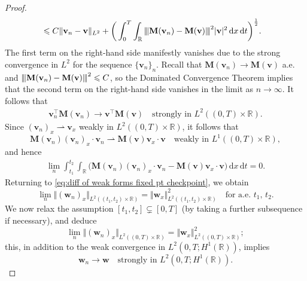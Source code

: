 \documentclass[11pt,a4paper,reqno]{amsart}
\numberwithin{equation}{section}
\theoremstyle{definition}
\theoremstyle{remark}
\newcommand{\vertiii}[1]{{\left\vert\kern-0.25ex\left\vert\kern-0.25ex\left\vert #1 
    \right\vert\kern-0.25ex\right\vert\kern-0.25ex\right\vert}}
\newcommand{\bv}{\mathbf{v}}
\newcommand{\bw}{\mathbf{w}}
\renewcommand{\d}{\, \mathrm{d}}
\newcommand{\bM}{\mathbf{M}}
\renewcommand{\leq}{\leqslant}
\begin{document}
{\begin{proof}
\begin{equation}
\begin{aligned}
      &\leq C \Vert \bv_n - \bv \Vert_{L^2} + \bigg( \int_{0}^{T}\int_\mathbb{R} \vertiii{\bM(\bv_n) - \bM(\bv)}^2 |\bv|^2 \d x \d t \bigg)^{\frac{1}{2}}. 
    \end{aligned}
\end{equation}
The first term on the right-hand side manifestly vanishes due to the strong convergence in $L^2$ for the sequence $\{\bv_n\}_n$. Recall that $\bM(\bv_n) \to \bM(\bv)$ a.e.~ and $\vertiii{\bM(\bv_n) - \bM(\bv)}^2 \leq C$, so the Dominated Convergence Theorem implies that the second term on the right-hand side vanishes in the limit as $n\to\infty$. It follows that 
\begin{equation*}
    \begin{aligned}
      \bv_n^\intercal \bM(\bv_n) \to \bv^\intercal \bM(\bv) \quad \text{strongly in } L^2((0,T)\times\mathbb{R}). 
    \end{aligned}
\end{equation*}
Since $(\bv_n)_x \rightharpoonup \bv_x$ weakly in $L^2((0,T)\times\mathbb{R})$, it follows that 
\begin{equation*}
    \bM(\bv_n) (\bv_n)_x \cdot \bv_n \rightharpoonup \bM(\bv) \bv_x \cdot \bv \quad \text{weakly in } L^1((0,T)\times\mathbb{R}), 
\end{equation*}
and hence 
\begin{equation*}
      \begin{aligned} 
      \lim_n \int_{t_1}^{t_2}\int_\mathbb{R} \Big( \bM(\bv_n) (\bv_n)_x \cdot \bv_n - \bM(\bv) \bv_x \cdot \bv \Big) \d x \d t = 0. 
   \end{aligned}
\end{equation*}
Returning to \eqref{eq:diff of weak forms fixed pt checkpoint}, we obtain 
\begin{equation*}
    \lim_n \Vert (\bw_n)_x \Vert_{L^2((t_1,t_2)\times\mathbb{R})} = \Vert \bw_x \Vert^2_{L^2((t_1,t_2)\times\mathbb{R})} \quad \text{for a.e.~}t_1, \, t_2. 
\end{equation*}
We now relax the assumption $[t_1,t_2] \subsetneq [0,T]$ (by taking a further subsequence if necessary), and deduce 
\begin{equation*}
    \lim_n \Vert (\bw_n)_x \Vert_{L^2((0,T)\times\mathbb{R})} = \Vert \bw_x \Vert^2_{L^2((0,T)\times\mathbb{R})}; 
\end{equation*}
this, in addition to the weak convergence in $L^2(0,T;H^1(\mathbb{R}))$, implies 
\begin{equation}\label{eq:strong conv L2H1 for fixed pt}
    \bw_n \to \bw \quad \text{strongly in } L^2(0,T;H^1(\mathbb{R})). 
\end{equation}



\end{proof}}
\end{document}
